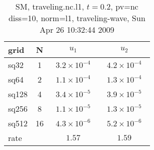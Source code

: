 \begin{table}[hbt]\tableFont %
\begin{center}
\begin{tabular}{|l|c|c|c|} \hline\hline 
grid  & N &  $u_1$ & $u_2$  \\ \hline 
                sq32 &     1 & ~$3.2\times10^{ -4}$~ & ~$4.2\times10^{ -4}$~  \\ \hline
                sq64 &     2 & ~$1.1\times10^{ -4}$~ & ~$1.3\times10^{ -4}$~  \\ \hline
               sq128 &     4 & ~$3.4\times10^{ -5}$~ & ~$3.9\times10^{ -5}$~  \\ \hline
               sq256 &     8 & ~$1.1\times10^{ -5}$~ & ~$1.3\times10^{ -5}$~  \\ \hline
               sq512 &    16 & ~$4.3\times10^{ -6}$~ & ~$5.2\times10^{ -6}$~  \\ \hline
    rate             &       &       $1.57$          &       $1.59$           \\ \hline\hline
\end{tabular}
\caption{SM, traveling.nc.l1, $t=0.2$,  pv=nc diss=10, norm=l1, traveling-wave, Sun Apr 26 10:32:44 2009}\label{table:traveling.nc.l1}
\end{center}
\end{table}
